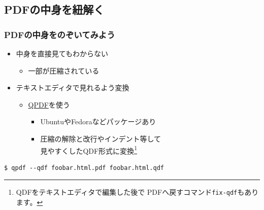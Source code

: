 \subsection{PDFの中身を紐解く}
\begin{frame}[fragile]\frametitle{PDFの中身をのぞいてみよう}
  \begin{itemize}
  \item 中身を直接見てもわからない
    \begin{itemize}
    \item 一部が圧縮されている
    \end{itemize}
  \item テキストエディタで見れるよう変換
    \begin{itemize}
    \item \href{http://qpdf.sourceforge.net/}{QPDF}を使う
      \begin{itemize}
      \item UbuntuやFedoraなどパッケージあり
      \item 圧縮の解除と改行やインデント等して \\
        見やすくしたQDF形式に変換\footnote{\tiny
        QDFをテキストエディタで編集した後で
        PDFへ戻すコマンド\texttt{fix-qdf}もあります。}
      \end{itemize}
    \end{itemize}
  \end{itemize}

  \centering
  \begin{tcolorbox}[width=0.8\linewidth,left=0mm,right=0mm,top=0mm,bottom=0mm,%
      colframe=structure.fg,colbacktitle=structure.fg,colback=structure.bg]
    \begin{lstlisting}
$ qpdf --qdf foobar.html.pdf foobar.html.qdf
    \end{lstlisting}
  \end{tcolorbox}
\end{frame}

